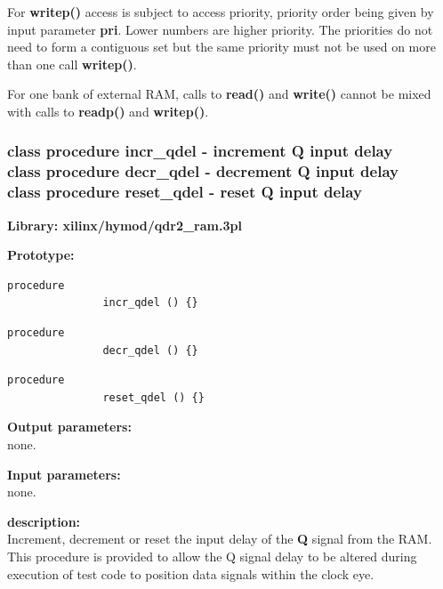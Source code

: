             For {\bf writep()} access is subject to access priority,
            priority order being given by input parameter {\bf pri}. Lower
            numbers are higher priority. The priorities do not need to form a
            contiguous set but the same priority must not be used on more than
            one call {\bf writep()}.
            
            For one bank of external RAM, calls to {\bf read()} and {\bf
            write()} cannot be mixed with calls to {\bf readp()} and
            {\bf writep()}.



        \subsubsection{ class procedure incr\_qdel - increment Q input delay\\
                        class procedure decr\_qdel - decrement Q input delay\\
                        class procedure reset\_qdel - reset Q input delay}\label{sec:lcqdr2ramqdel}
        

            {\bf Library: xilinx/hymod/qdr2\_ram.3pl}

            {\bf Prototype:} \\
            \vsp
            \begin{lstlisting}[gobble=12, language=threepl]
               procedure
               incr_qdel () {}
            \end{lstlisting}
            \vsp
            \begin{lstlisting}[gobble=12, language=threepl]
               procedure
               decr_qdel () {}
            \end{lstlisting}
            \vsp
            \begin{lstlisting}[gobble=12, language=threepl]
               procedure
               reset_qdel () {}
            \end{lstlisting}

            {\bf Output parameters:} \\
            
            none.

            {\bf Input parameters:} \\
            
            none.

            {\bf description:} \\
            Increment, decrement or reset the input delay of the {\bf Q}
            signal from the RAM. This procedure is provided to allow the Q
            signal delay to be altered during execution of test code to
            position data signals within the clock eye.
            



